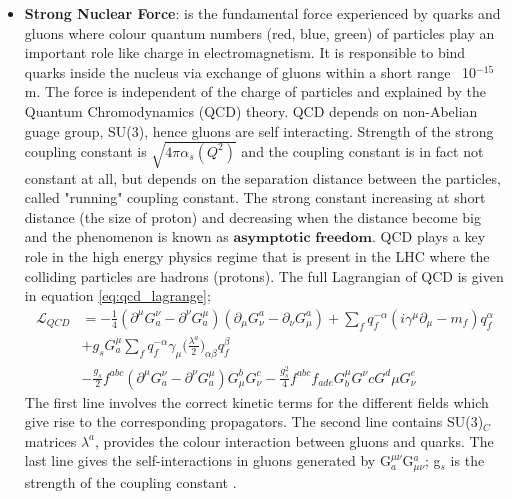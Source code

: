 \begin{itemize}
\item{\textbf{Strong Nuclear Force}}: is the fundamental force experienced by quarks and gluons where colour quantum numbers (red, blue, green) of particles play an important role like charge in electromagnetism. It is responsible to bind quarks inside the nucleus via exchange of gluons within a short range ~10$^{-15}$m. The force is independent of the charge of particles and explained by the Quantum Chromodynamics (QCD) theory. QCD depends on non-Abelian guage group, SU(3), hence gluons are self interacting. Strength of the strong coupling constant is $\sqrt{4\pi\alpha_{s}(Q^{2})} $ and the coupling constant is in fact not constant at all, but depends on the separation distance between the particles, called "running" coupling constant. The strong constant increasing at short distance (the size of proton) and decreasing when the distance become big and the phenomenon is known as $\textbf{asymptotic freedom}$. QCD plays a key role in the high energy physics regime that is present in the LHC where the colliding particles are hadrons (protons). The full Lagrangian of QCD is given in equation \ref{eq:qcd_lagrange};
\begin{equation}\begin{split}
\mathcal{L}_{QCD} & = -\frac{1}{4}(\partial^{\mu}G^{\nu}_{a} - \partial^{\nu}G^{\mu}_{a})(\partial_{\mu}G_{\nu}^{a} - \partial_{\nu}G_{\mu}^{a}) + \sum\limits_{f}q^{-\alpha}_{f}(i\gamma^{\mu}\partial_{\mu} - m_{f})q^{\alpha}_{f} \\
& + g_{s}G^{\mu}_{a} \sum\limits_{f} q^{-\alpha}_{f}\gamma_{\mu}\bigg(\frac{\lambda^{a}}{2}\bigg)_{\alpha\beta}q^{\beta}_{f}\\
& - \frac{g_{s}}{2}f^{abc}(\partial^{\mu}G^{\nu}_{a} - \partial^{\nu}G^{\mu}_{a})G_{\mu}^{b}G_{\nu}^{c} - \frac{g_{s}^{2}}{4}f^{abc}f_{ade}G^{\mu}_{b}G^{\nu}{c}G^{d}{\mu}G^{e}_{\nu}
\end{split}
\end{equation} \label{eq:qcd_lagrange}    
The first line involves the correct kinetic terms for the different fields which give rise to the corresponding propagators. The second line contains SU(3)$_{C}$ matrices $\lambda^{a}$, provides the colour interaction between gluons and quarks. The last line gives the self-interactions in gluons generated by G$^{\mu\nu}_{a}$G$_{\mu\nu}^{a}$; g$_{s}$ is the strength of the coupling constant \cite{strong_force}. 


\end{itemize}
